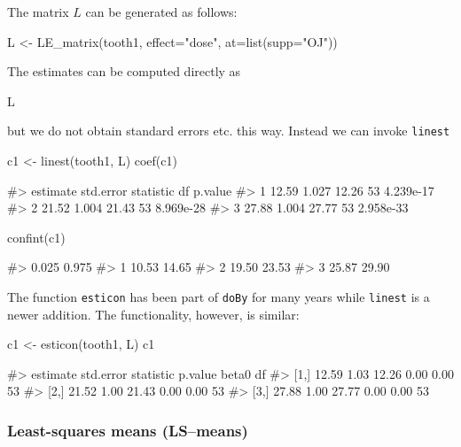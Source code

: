 The matrix \(L\) can be generated as follows:

\begin{Schunk}
\begin{Sinput}
L <- LE_matrix(tooth1, effect="dose", at=list(supp="OJ"))
\end{Sinput}
\end{Schunk}

The estimates can be computed directly as

\begin{Schunk}
\begin{Sinput}
L %
\end{Sinput}
\end{Schunk}

but we do not obtain standard errors etc. this way. Instead we can
invoke \texttt{linest}

\begin{Schunk}
\begin{Sinput}
c1 <- linest(tooth1, L)
coef(c1)
\end{Sinput}
\begin{Soutput}
#>   estimate std.error statistic df   p.value
#> 1    12.59     1.027     12.26 53 4.239e-17
#> 2    21.52     1.004     21.43 53 8.969e-28
#> 3    27.88     1.004     27.77 53 2.958e-33
\end{Soutput}
\begin{Sinput}
confint(c1)
\end{Sinput}
\begin{Soutput}
#>   0.025 0.975
#> 1 10.53 14.65
#> 2 19.50 23.53
#> 3 25.87 29.90
\end{Soutput}
\end{Schunk}

The function \texttt{esticon} has been part of \texttt{doBy} for many
years while \texttt{linest} is a newer addition. The functionality,
however, is similar:

\begin{Schunk}
\begin{Sinput}
c1 <- esticon(tooth1, L)
c1
\end{Sinput}
\begin{Soutput}
#>      estimate std.error statistic p.value beta0 df
#> [1,]    12.59      1.03     12.26    0.00  0.00 53
#> [2,]    21.52      1.00     21.43    0.00  0.00 53
#> [3,]    27.88      1.00     27.77    0.00  0.00 53
\end{Soutput}
\end{Schunk}

\hypertarget{least-squares-means-lsmeans}{%
\subsubsection{Least-squares means
(LS--means)}\label{least-squares-means-lsmeans}}

